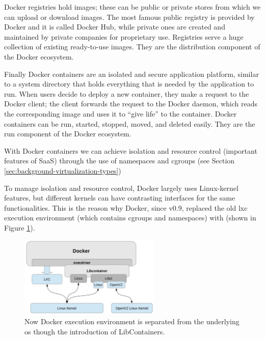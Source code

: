 Docker registries hold images; these can be public or private stores from which we can upload or
download images. The most famous public registry is provided by Docker and it is called Docker Hub, while
private ones are created and maintained by private companies for proprietary use. Registries serve a
huge collection of existing ready-to-use images. They are the distribution component of the Docker
ecosystem.

Finally Docker containers are an isolated and secure application platform, similar to a system directory
that holds everything that is needed by the application to run. When users decide to deploy a new
container, they make a request to the Docker client; the client forwards the request to the Docker
daemon, which reads the corresponding image and uses it to “give life” to the container. Docker containers
can be run, started, stopped, moved, and deleted easily. They are the run component of the Docker ecosystem.

With Docker containers we can achieve isolation and resource control (important features of SaaS)
through the use of namespaces and cgroups (see Section \ref{sec:background-virtualization-types})

To manage isolation and resource control, Docker largely uses Linux-kernel features, but different kernels
can have contrasting interfaces for the same functionalities. This is the reason why Docker, since v0.9,
replaced the old \ac{lxc} execution environment (which contains cgroups and namespaces) with
 (shown in Figure \ref{img:background-docker-architecture-libcontainer}).

\begin{figure}
	\centering{}
	\includegraphics[width=0.6\textwidth]{chapters/background/images/libcontainer.png}
	\caption[Docker libcontainer overview]{Now Docker execution environment is separated from the underlying
		\acs{os} though the introduction of LibContainers.}
	\label{img:background-docker-architecture-libcontainer}
\end{figure}

